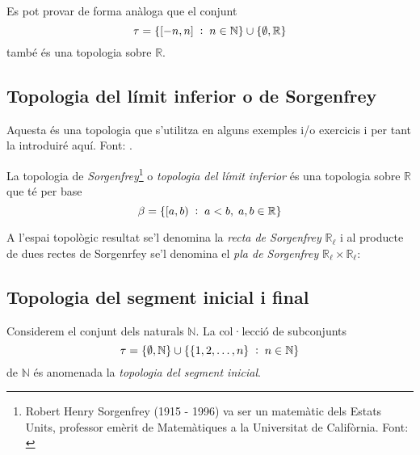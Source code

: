 \documentclass[../main.tex]{subfiles}
\begin{document}
Es pot provar de forma anàloga que el conjunt
\begin{equation}
    \notag
    \tau = \{[-n,n]\;:\;n\in\mathbb{N}\}\cup\{\emptyset,\mathbb{R}\}
\end{equation}
també és una topologia sobre $\mathbb{R}$.

\subsection{Topologia del límit inferior o de Sorgenfrey}
Aquesta és una topologia que s'utilitza en alguns exemples i/o exercicis i per tant la introduiré aquí. Font: \cite{problemasyecuaciones}.
\begin{defi}
 La topologia de \textit{Sorgenfrey}\footnote{Robert Henry Sorgenfrey (1915 - 1996) va ser un matemàtic dels Estats Units, professor emèrit de Matemàtiques a la Universitat de Califòrnia. Font: \cite{wikisorgenfrey}} o \textit{topologia del límit inferior} és una topologia sobre $\mathbb{R}$ que té per base
\begin{equation}
    \notag
    \beta = \{[a,b)\;:\;a<b,\;a,b\in\mathbb{R}\}
\end{equation}
\end{defi}

A l'espai topològic resultat se'l denomina la \textit{recta de Sorgenfrey} $\mathbb{R}_\ell$ i al producte de dues rectes de Sorgenrfey se'l denomina el \textit{pla de Sorgenfrey} $\mathbb{R}_\ell\times\mathbb{R}_\ell$:

\subsection{Topologia del segment inicial i final}

\begin{defi}
\label{def:topologiadelsegmentinicial} Considerem el conjunt dels naturals $\mathbb{N}$. La col·lecció de subconjunts 
\begin{equation}
    \notag
    \tau = \{\emptyset,\mathbb{N}\}\cup\{\{1,2,\ldots,n\}\;:\;n\in\mathbb{N}\}
\end{equation}
de $\mathbb{N}$ és anomenada la \textit{topologia del segment inicial}. 
\end{defi}
\end{document}
